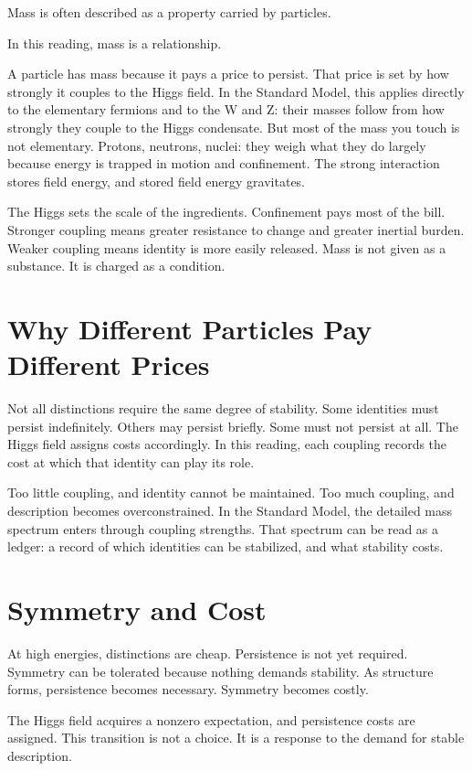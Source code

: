 \documentclass[11pt,twoside,openright]{book}
\begin{document}
Mass is often described as a property carried by particles.

In this reading, mass is a relationship.

A particle has mass because it pays a price to persist. That price is set by how strongly it couples to the Higgs field. In the Standard Model, this applies directly to the elementary fermions and to the W and Z: their masses follow from how strongly they couple to the Higgs condensate. But most of the mass you touch is not elementary. Protons, neutrons, nuclei: they weigh what they do largely because energy is trapped in motion and confinement. The strong interaction stores field energy, and stored field energy gravitates.

The Higgs sets the scale of the ingredients. Confinement pays most of the bill. Stronger coupling means greater resistance to change and greater inertial burden. Weaker coupling means identity is more easily released. Mass is not given as a substance. It is charged as a condition.

\section*{Why Different Particles Pay Different Prices}

Not all distinctions require the same degree of stability. Some identities must persist indefinitely. Others may persist briefly. Some must not persist at all. The Higgs field assigns costs accordingly. In this reading, each coupling records the cost at which that identity can play its role.

Too little coupling, and identity cannot be maintained. Too much coupling, and description becomes overconstrained. In the Standard Model, the detailed mass spectrum enters through coupling strengths. That spectrum can be read as a ledger: a record of which identities can be stabilized, and what stability costs.

\section*{Symmetry and Cost}

At high energies, distinctions are cheap. Persistence is not yet required. Symmetry can be tolerated because nothing demands stability. As structure forms, persistence becomes necessary. Symmetry becomes costly.

The Higgs field acquires a nonzero expectation, and persistence costs are assigned. This transition is not a choice. It is a response to the demand for stable description.
\end{document}
